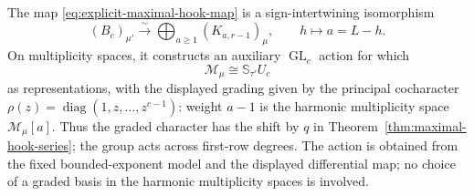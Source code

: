 \begin{samepage}
\begin{theorem}
\label{thm:maximal-hook-action}
The map \eqref{eq:explicit-maximal-hook-map} is a sign-intertwining
isomorphism
\[
 (B_c)_{\mu'}\xrightarrow{\ \sim\ }
                     \bigoplus_{a\ge1}(K_{a,r-1})_\mu,
 \qquad h\longmapsto a=L-h.
\]
On multiplicity spaces, it constructs an auxiliary
$\operatorname{GL}_c$ action for which
\[
                    \mathcal M_\mu\cong\mathbb S_{\tau'}U_c
\]
as representations, with the displayed grading given by the
principal cocharacter
$\rho(z)=\operatorname{diag}(1,z,\ldots,z^{c-1})$:
weight $a-1$ is the harmonic multiplicity space $\mathcal M_\mu[a]$.
Thus the graded character has the shift by $q$ in
Theorem~\ref{thm:maximal-hook-series}; the group acts across first-row degrees.
The action is obtained from the fixed bounded-exponent model and the
displayed differential map; no choice of a graded basis in the harmonic
multiplicity spaces is involved.
\end{theorem}
\end{samepage}
